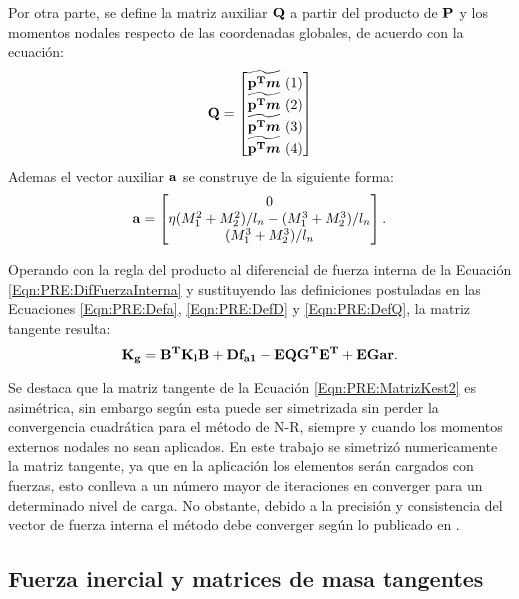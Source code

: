  Por otra parte, se define la matriz auxiliar $\bf{Q}$  a partir del producto de $\bf{P}$ y los momentos nodales respecto de las coordenadas globales, de acuerdo con la ecuación:
 \begin{equation}
 	\label{Eqn:PRE:DefQ}
 	\bf{Q}=\begin{bmatrix}
 		\widetilde{\bf{p}^T\boldsymbol{m}} ~(1)\\
 		\widetilde{\bf{p}^T\boldsymbol{m}} ~(2)\\
 		\widetilde{\bf{p}^T\boldsymbol{m}} ~(3)\\
 		\widetilde{\bf{p}^T\boldsymbol{m}} ~(4)
 	\end{bmatrix}
 \end{equation}
Ademas el vector auxiliar $\bf{a}$ se construye de la siguiente forma:
\begin{equation}
	\label{Eqn:PRE:Defa}
\bf{a} =\begin{bmatrix}
	0\\
	\eta(M_1^2+M_2^2)/l_n-(M_1^3+M_2^3)/l_n\\
	(M_1^3+M_2^3)/l_n
\end{bmatrix}.
\end{equation}



Operando con la regla del producto al diferencial de fuerza interna de la Ecuación  \eqref{Eqn:PRE:DifFuerzaInterna} y sustituyendo las definiciones postuladas en las Ecuaciones \eqref{Eqn:PRE:Defa}, \eqref{Eqn:PRE:DefD} y \eqref{Eqn:PRE:DefQ}, la matriz tangente resulta:
\begin{equation} 
	\label{Eqn:PRE:MatrizKest2}
	\bf{K_g}=\bf{B}^T\bf{K_l}\bf{B}+\bf{D} f_{a1}-\bf{E}\bf{Q}\bf{G^T}\bf{E^T} +\bf{EGar}.
\end{equation}

Se destaca que la matriz tangente de la Ecuación  \eqref{Eqn:PRE:MatrizKest2} es asimétrica, sin embargo según \cite{Nour-Omid1991} esta puede ser simetrizada sin perder la convergencia cuadrática
para el método de  \gls{N-R}, siempre y cuando los momentos externos nodales no sean aplicados. En este trabajo se simetrizó numericamente la matriz tangente, ya que en la aplicación los elementos serán cargados con fuerzas, esto conlleva a un número mayor de iteraciones en converger para un determinado nivel de carga. No obstante, debido a la precisión y consistencia del vector de fuerza interna el método debe converger según lo publicado en \citep{rankin1988use}.

\subsection{Fuerza inercial y matrices de masa tangentes}\label{Sec:PRE:Inercial}

